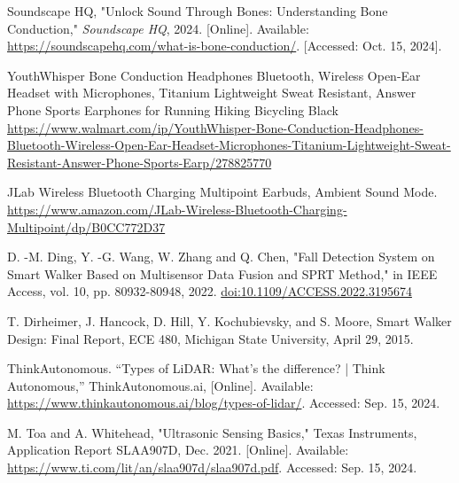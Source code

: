 \begin{thebibliography}{45}
	 Soundscape HQ, "Unlock Sound Through Bones: Understanding Bone Conduction," \emph{Soundscape HQ}, 2024. [Online]. Available: \href{https://soundscapehq.com/what-is-bone-conduction/}{https://soundscapehq.com/what-is-bone-conduction/}. [Accessed: Oct. 15, 2024].

	
	 YouthWhisper Bone Conduction Headphones Bluetooth, Wireless Open-Ear Headset with Microphones, Titanium Lightweight Sweat Resistant, Answer Phone Sports Earphones for Running Hiking Bicycling Black \href{https://www.walmart.com/ip/YouthWhisper-Bone-Conduction-Headphones-Bluetooth-Wireless-Open-Ear-Headset-Microphones-Titanium-Lightweight-Sweat-Resistant-Answer-Phone-Sports-Earp/278825770?clickid=WjORv5UqyxyKRJqTvVUblVgLUkCRR\%3AxQe1ri}{https://www.walmart.com/ip/YouthWhisper-Bone-Conduction-Headphones-Bluetooth-Wireless-Open-Ear-Headset-Microphones-Titanium-Lightweight-Sweat-Resistant-Answer-Phone-Sports-Earp/278825770}
	
	 JLab Wireless Bluetooth Charging Multipoint Earbuds, Ambient Sound Mode. \href{https://www.amazon.com/JLab-Wireless-Bluetooth-Charging-Multipoint/dp/B0CC772D37}{https://www.amazon.com/JLab-Wireless-Bluetooth-Charging-Multipoint/dp/B0CC772D37}
	
	 D. -M. Ding, Y. -G. Wang, W. Zhang and Q. Chen, "Fall Detection System on Smart Walker Based on Multisensor Data Fusion and SPRT Method," in IEEE Access, vol. 10, pp. 80932-80948, 2022. \href{https://doi.org/10.1109/ACCESS.2022.3195674}{doi:10.1109/ACCESS.2022.3195674}
	
	 T. Dirheimer, J. Hancock, D. Hill, Y. Kochubievsky, and S. Moore, Smart Walker Design: Final Report, ECE 480, Michigan State University, April 29, 2015.
	
	 ThinkAutonomous. “Types of LiDAR: What's the difference? | Think Autonomous,” ThinkAutonomous.ai, [Online]. Available: \href{https://www.thinkautonomous.ai/blog/types-of-lidar/}{https://www.thinkautonomous.ai/blog/types-of-lidar/}. Accessed: Sep. 15, 2024.
	
	 M. Toa and A. Whitehead, "Ultrasonic Sensing Basics," Texas Instruments, Application Report SLAA907D, Dec. 2021. [Online]. Available: \href{https://www.ti.com/lit/an/slaa907d/slaa907d.pdf}{https://www.ti.com/lit/an/slaa907d/slaa907d.pdf}. Accessed: Sep. 15, 2024.
	

\end{thebibliography}
